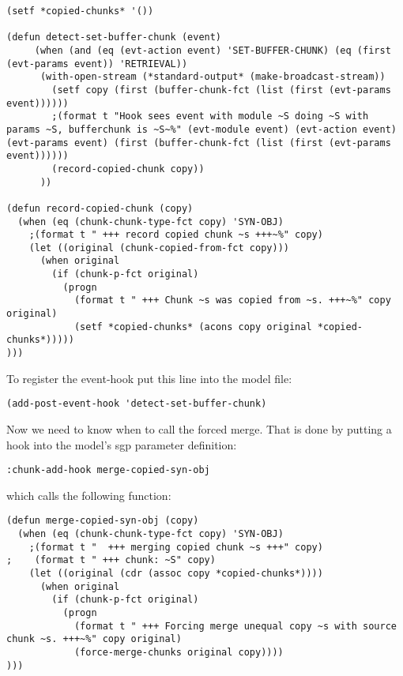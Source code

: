 \documentclass[nobf,fignum,doc,longtable]{apa}
\begin{document}
{\scriptsize \begin{verbatim}
(setf *copied-chunks* '())

(defun detect-set-buffer-chunk (event)
     (when (and (eq (evt-action event) 'SET-BUFFER-CHUNK) (eq (first (evt-params event)) 'RETRIEVAL))
      (with-open-stream (*standard-output* (make-broadcast-stream))
        (setf copy (first (buffer-chunk-fct (list (first (evt-params event))))))
        ;(format t "Hook sees event with module ~S doing ~S with params ~S, bufferchunk is ~S~%" (evt-module event) (evt-action event) (evt-params event) (first (buffer-chunk-fct (list (first (evt-params event))))))
        (record-copied-chunk copy))
      ))

(defun record-copied-chunk (copy)
  (when (eq (chunk-chunk-type-fct copy) 'SYN-OBJ)
    ;(format t " +++ record copied chunk ~s +++~%" copy)
    (let ((original (chunk-copied-from-fct copy)))
      (when original
        (if (chunk-p-fct original)
          (progn 
            (format t " +++ Chunk ~s was copied from ~s. +++~%" copy original)
            (setf *copied-chunks* (acons copy original *copied-chunks*)))))
)))
\end{verbatim}}

To register the event-hook put this line into the model file:
{\small \begin{verbatim}
(add-post-event-hook 'detect-set-buffer-chunk)
\end{verbatim}}

Now we need to know when to call the forced merge. That is done by putting a hook into the model's sgp parameter definition:
{\small \begin{verbatim}
:chunk-add-hook merge-copied-syn-obj
\end{verbatim}}

which calls the following function:

{\scriptsize \begin{verbatim}
(defun merge-copied-syn-obj (copy)
  (when (eq (chunk-chunk-type-fct copy) 'SYN-OBJ)
    ;(format t "  +++ merging copied chunk ~s +++" copy)
;    (format t " +++ chunk: ~S" copy)
    (let ((original (cdr (assoc copy *copied-chunks*))))
      (when original
        (if (chunk-p-fct original)
          (progn 
            (format t " +++ Forcing merge unequal copy ~s with source chunk ~s. +++~%" copy original)
            (force-merge-chunks original copy))))
)))
\end{verbatim} }
\end{document}
